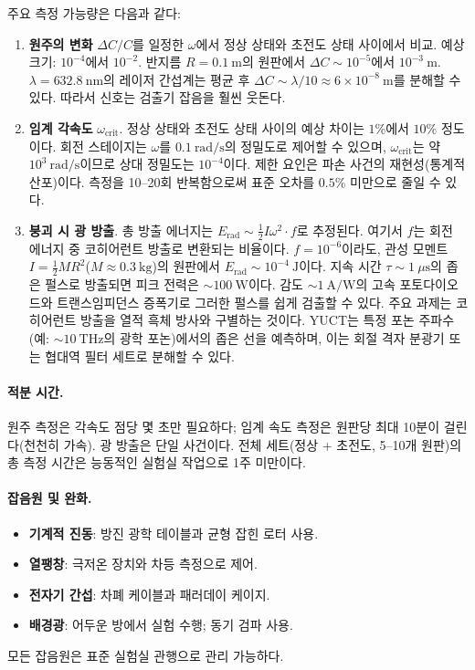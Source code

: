 \documentclass[12pt,a4paper]{article}
\begin{document}
	주요 측정 가능량은 다음과 같다:
	\begin{enumerate}
		\item \textbf{원주의 변화} \(\Delta C/C\)를 일정한 \(\omega\)에서 정상 상태와 초전도 상태 사이에서 비교. 예상 크기: \(10^{-4}\)에서 \(10^{-2}\). 반지름 \(R = 0.1\ \text{m}\)의 원판에서 \(\Delta C \sim 10^{-5}\)에서 \(10^{-3}\ \text{m}\). \(\lambda = 632.8\ \text{nm}\)의 레이저 간섭계는 평균 후 \(\Delta C \sim \lambda/10 \approx 6\times10^{-8}\ \text{m}\)를 분해할 수 있다. 따라서 신호는 검출기 잡음을 훨씬 웃돈다.
		
		\item \textbf{임계 각속도} \(\omega_{\text{crit}}\). 정상 상태와 초전도 상태 사이의 예상 차이는 \(1\%\)에서 \(10\%\) 정도이다. 회전 스테이지는 \(\omega\)를 \(0.1\ \text{rad/s}\)의 정밀도로 제어할 수 있으며, \(\omega_{\text{crit}}\)는 약 \(10^3\ \text{rad/s}\)이므로 상대 정밀도는 \(10^{-4}\)이다. 제한 요인은 파손 사건의 재현성(통계적 산포)이다. 측정을 10–20회 반복함으로써 표준 오차를 \(0.5\%\) 미만으로 줄일 수 있다.
		
		\item \textbf{붕괴 시 광 방출}. 총 방출 에너지는 \(E_{\text{rad}} \sim \frac{1}{2} I \omega^2 \cdot f\)로 추정된다. 여기서 \(f\)는 회전 에너지 중 코히어런트 방출로 변환되는 비율이다. \(f = 10^{-6}\)이라도, 관성 모멘트 \(I = \frac{1}{2} M R^2\)(\(M \approx 0.3\ \text{kg}\))의 원판에서 \(E_{\text{rad}} \sim 10^{-4}\ \text{J}\)이다. 지속 시간 \(\tau \sim 1\ \mu\text{s}\)의 좁은 펄스로 방출되면 피크 전력은 \(\sim 100\ \text{W}\)이다. 감도 \(\sim 1\ \text{A/W}\)의 고속 포토다이오드와 트랜스임피던스 증폭기로 그러한 펄스를 쉽게 검출할 수 있다. 주요 과제는 코히어런트 방출을 열적 흑체 방사와 구별하는 것이다. YUCT는 특정 포논 주파수(예: \(\sim 10\ \text{THz}\)의 광학 포논)에서의 좁은 선을 예측하며, 이는 회절 격자 분광기 또는 협대역 필터 세트로 분해할 수 있다.
	\end{enumerate}
	
	\paragraph{적분 시간.}
	원주 측정은 각속도 점당 몇 초만 필요하다; 임계 속도 측정은 원판당 최대 10분이 걸린다(천천히 가속). 광 방출은 단일 사건이다. 전체 세트(정상 + 초전도, 5–10개 원판)의 총 측정 시간은 능동적인 실험실 작업으로 1주 미만이다.
	
	\paragraph{잡음원 및 완화.}
	\begin{itemize}
		\item \textbf{기계적 진동}: 방진 광학 테이블과 균형 잡힌 로터 사용.
		\item \textbf{열팽창}: 극저온 장치와 차등 측정으로 제어.
		\item \textbf{전자기 간섭}: 차폐 케이블과 패러데이 케이지.
		\item \textbf{배경광}: 어두운 방에서 실험 수행; 동기 검파 사용.
	\end{itemize}
	모든 잡음원은 표준 실험실 관행으로 관리 가능하다.
	
\end{document}
